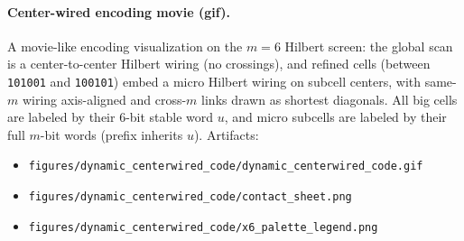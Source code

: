 \paragraph{Center-wired encoding movie (gif).} \AuditTag A movie-like encoding visualization on the $m=6$ Hilbert screen: the global scan is a center-to-center Hilbert wiring (no crossings), and refined cells (between \texttt{101001} and \texttt{100101}) embed a micro Hilbert wiring on subcell centers, with same-$m$ wiring axis-aligned and cross-$m$ links drawn as shortest diagonals. All big cells are labeled by their $6$-bit stable word $u$, and micro subcells are labeled by their full $m$-bit words (prefix inherits $u$).
\AuditTag Artifacts:
\begin{itemize}
\item \texttt{figures/dynamic_centerwired_code/dynamic_centerwired_code.gif}
\item \texttt{figures/dynamic_centerwired_code/contact_sheet.png}
\item \texttt{figures/dynamic_centerwired_code/x6_palette_legend.png}
\end{itemize}

